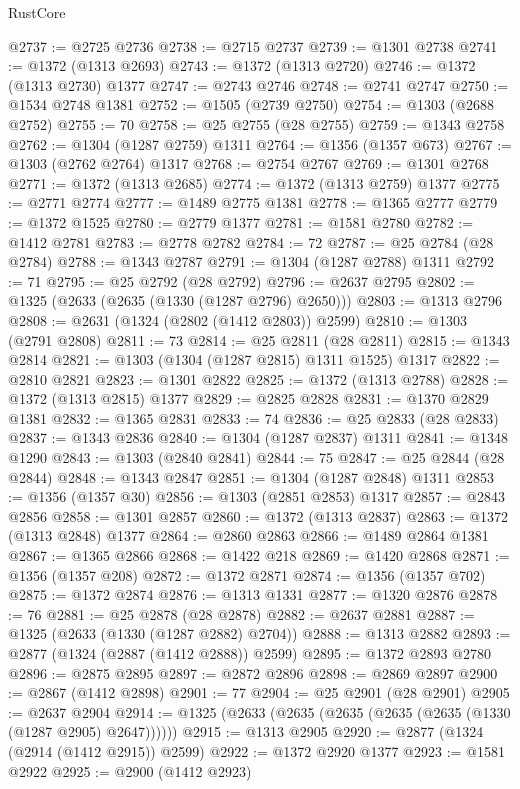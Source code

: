 \begin{lexlean}{RustCore}
\begin{coremodule}
@2737 := @2725 @2736
@2738 := @2715 @2737
@2739 := @1301 @2738
@2741 := @1372 (@1313 @2693)
@2743 := @1372 (@1313 @2720)
@2746 := @1372 (@1313 @2730) @1377
@2747 := @2743 @2746
@2748 := @2741 @2747
@2750 := @1534 @2748 @1381
@2752 := @1505 (@2739 @2750)
@2754 := @1303 (@2688 @2752)
@2755 := 70
@2758 := @25 @2755 (@28 @2755)
@2759 := @1343 @2758
@2762 := @1304 (@1287 @2759) @1311
@2764 := @1356 (@1357 @673)
@2767 := @1303 (@2762 @2764) @1317
@2768 := @2754 @2767
@2769 := @1301 @2768
@2771 := @1372 (@1313 @2685)
@2774 := @1372 (@1313 @2759) @1377
@2775 := @2771 @2774
@2777 := @1489 @2775 @1381
@2778 := @1365 @2777
@2779 := @1372 @1525
@2780 := @2779 @1377
@2781 := @1581 @2780
@2782 := @1412 @2781
@2783 := @2778 @2782
@2784 := 72
@2787 := @25 @2784 (@28 @2784)
@2788 := @1343 @2787
@2791 := @1304 (@1287 @2788) @1311
@2792 := 71
@2795 := @25 @2792 (@28 @2792)
@2796 := @2637 @2795
@2802 := @1325 (@2633 (@2635 (@1330 (@1287 @2796) @2650)))
@2803 := @1313 @2796
@2808 := @2631 (@1324 (@2802 (@1412 @2803)) @2599)
@2810 := @1303 (@2791 @2808)
@2811 := 73
@2814 := @25 @2811 (@28 @2811)
@2815 := @1343 @2814
@2821 := @1303 (@1304 (@1287 @2815) @1311 @1525) @1317
@2822 := @2810 @2821
@2823 := @1301 @2822
@2825 := @1372 (@1313 @2788)
@2828 := @1372 (@1313 @2815) @1377
@2829 := @2825 @2828
@2831 := @1370 @2829 @1381
@2832 := @1365 @2831
@2833 := 74
@2836 := @25 @2833 (@28 @2833)
@2837 := @1343 @2836
@2840 := @1304 (@1287 @2837) @1311
@2841 := @1348 @1290
@2843 := @1303 (@2840 @2841)
@2844 := 75
@2847 := @25 @2844 (@28 @2844)
@2848 := @1343 @2847
@2851 := @1304 (@1287 @2848) @1311
@2853 := @1356 (@1357 @30)
@2856 := @1303 (@2851 @2853) @1317
@2857 := @2843 @2856
@2858 := @1301 @2857
@2860 := @1372 (@1313 @2837)
@2863 := @1372 (@1313 @2848) @1377
@2864 := @2860 @2863
@2866 := @1489 @2864 @1381
@2867 := @1365 @2866
@2868 := @1422 @218
@2869 := @1420 @2868
@2871 := @1356 (@1357 @208)
@2872 := @1372 @2871
@2874 := @1356 (@1357 @702)
@2875 := @1372 @2874
@2876 := @1313 @1331
@2877 := @1320 @2876
@2878 := 76
@2881 := @25 @2878 (@28 @2878)
@2882 := @2637 @2881
@2887 := @1325 (@2633 (@1330 (@1287 @2882) @2704))
@2888 := @1313 @2882
@2893 := @2877 (@1324 (@2887 (@1412 @2888)) @2599)
@2895 := @1372 @2893 @2780
@2896 := @2875 @2895
@2897 := @2872 @2896
@2898 := @2869 @2897
@2900 := @2867 (@1412 @2898)
@2901 := 77
@2904 := @25 @2901 (@28 @2901)
@2905 := @2637 @2904
@2914 := @1325 (@2633 (@2635 (@2635 (@2635 (@2635 (@1330 (@1287 @2905) @2647))))))
@2915 := @1313 @2905
@2920 := @2877 (@1324 (@2914 (@1412 @2915)) @2599)
@2922 := @1372 @2920 @1377
@2923 := @1581 @2922
@2925 := @2900 (@1412 @2923)

\end{coremodule}
\end{lexlean}

